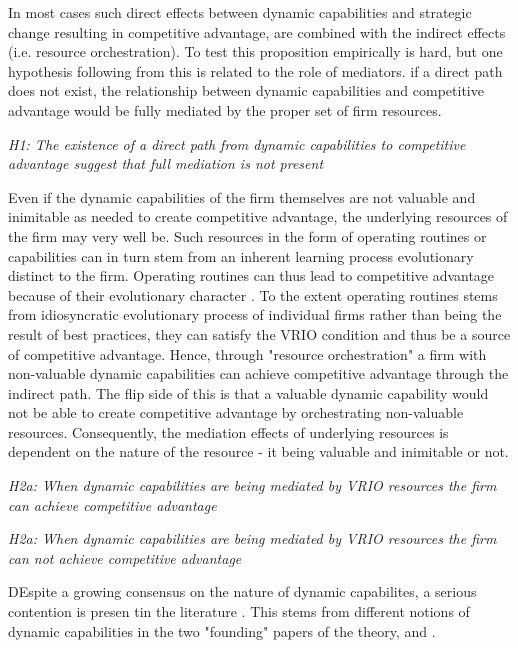 In most cases such direct effects between dynamic capabilities and strategic change
resulting in competitive advantage, are combined with the indirect effects (i.e. resource
orchestration). To test this proposition empirically is hard, but one hypothesis following
from this is related to the role of mediators. if a direct path does not exist, the
relationship between dynamic capabilities and competitive advantage would be fully
mediated by the proper set of firm resources. 

\emph{H1: The existence of a direct path from dynamic capabilities to competitive advantage
suggest that full mediation is not present}
 

Even if the dynamic capabilities of the firm themselves are not valuable and inimitable as
needed to create competitive advantage, the underlying resources of the firm may very well
be. Such resources in the form of operating routines or capabilities can in turn stem from
an inherent learning process evolutionary distinct to the firm. Operating routines can
thus lead to competitive advantage because of their evolutionary character
\citep{Nelson1982,Winter2003}. To the extent operating routines stems from idiosyncratic
evolutionary process of individual firms rather than being the result of best practices,
they can satisfy the VRIO condition and thus be a source of competitive advantage.  Hence,
through "resource orchestration" a firm with non-valuable dynamic capabilities can achieve
competitive advantage through the indirect path. The flip side of this is that a valuable
dynamic capability would not be able to create competitive advantage by orchestrating
non-valuable resources. Consequently, the mediation effects of underlying resources is
dependent on the nature of the resource - it being valuable and inimitable or not.

\emph{H2a: When dynamic capabilities are being mediated by VRIO resources the firm can
  achieve competitive advantage}

\emph{H2a: When dynamic capabilities are being mediated by VRIO resources the firm can not
  achieve competitive advantage}

DEspite a growing consensus on the nature of dynamic capabilites, a serious contention is
presen tin the literature \citep{Peteraf2013}. This stems from different notions of
dynamic capabilities in the two "founding" papers of the theory, \cite{Eisenhardt2000} and
\cite{Teece1997}.

